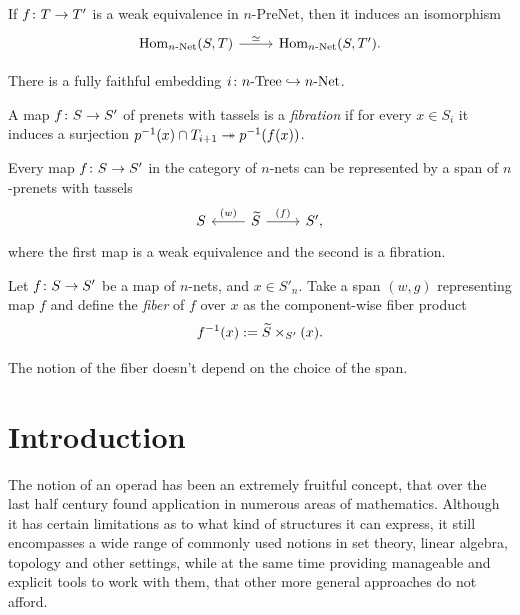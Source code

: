 \documentclass[letterpaper,12pt,leqno]{article}
\numberwithin{equation}{theorem}
\def\Net{\textrm{-}\mathrm{Net}}
\def\PreNet{\textrm{-}\mathrm{PreNet}}
\def\Tree{\textrm{-}\mathrm{Tree}}
\begin{document}
\begin{lemma}
If $f\colon T \to T'$ is a weak equivalence in $n\PreNet$, then it induces an isomorphism
$$
\begin{tikzcd}
\Hom_{n\Net}(S, T) \ar["\isom", r] & \Hom_{n\Net}(S, T').
\end{tikzcd}
$$
\end{lemma}

\begin{proposition}
There is a fully faithful embedding $i \from n\Tree \into n\Net$.
\end{proposition}

\begin{definition}
A map $f\colon S \to S'$ of prenets with tassels is a {\em fibration} if for every $x \in S_i$ it induces a surjection $p^{-1}(x) \cap T_{i+1} \twoheadrightarrow p^{-1}(f(x))$.
\end{definition}

\begin{lemma}
Every map $f \colon S \to S'$ in the category of $n$-nets can be represented by a span of $n$-prenets with tassels
$$
\begin{tikzcd}
S & \wtilde S \ar["(w)"', l] \ar["(f)", r] & S',
\end{tikzcd}
$$
where the first map is a weak equivalence and the second is a fibration.
\end{lemma}

Let $f\colon S \to S'$ be a map of $n$-nets, and $x \in S'_n$. Take a span $(w, g)$ representing map $f$ and define the {\em fiber} of $f$ over $x$ as the component-wise
fiber product
$$
f^{-1}(x) := \widetilde S \times_{S'} (x).
$$

\begin{lemma}
The notion of the fiber doesn't depend on the choice of the span.
\end{lemma}

\vfill\eject
\fi


\setcounter{section}{-1}
\section{Introduction}
The notion of an operad has been an extremely fruitful concept, that over the last half century found application in numerous areas of mathematics. Although it has
certain limitations as to what kind of structures it can express, it still encompasses a wide range of commonly used notions in set theory, linear algebra, topology
and other settings, while at the same time providing manageable and explicit tools to work with them, that other more general approaches do not afford.
\end{document}
